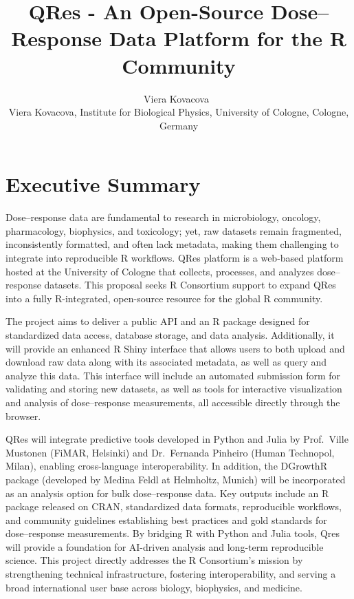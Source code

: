 \documentclass[
]{article}
\title{QRes - An Open-Source Dose--Response Data Platform for the R
Community}
\author{
{\large Viera Kovacova~\orcidlink{0000-0003-4581-4254}}%
 \\%
Viera Kovacova, Institute for Biological Physics, University of Cologne,
Cologne, Germany \\%
{\footnotesize \url{}} \and
}
\date{}
\newcommand{\published}[1]{%
   \gdef\puB{#1}}
\newcommand{\puB}{}
\begin{document}
\published{\textbf{2025-09-29}}

\maketitle






\section{Executive Summary}\label{executive-summary}

Dose--response data are fundamental to research in microbiology,
oncology, pharmacology, biophysics, and toxicology; yet, raw datasets
remain fragmented, inconsistently formatted, and often lack metadata,
making them challenging to integrate into reproducible R workflows. QRes
platform is a web-based platform hosted at the University of Cologne
that collects, processes, and analyzes dose--response datasets. This
proposal seeks R Consortium support to expand QRes into a fully
R-integrated, open-source resource for the global R community.

The project aims to deliver a public API and an R package designed for
standardized data access, database storage, and data analysis.
Additionally, it will provide an enhanced R Shiny interface that allows
users to both upload and download raw data along with its associated
metadata, as well as query and analyze this data. This interface will
include an automated submission form for validating and storing new
datasets, as well as tools for interactive visualization and analysis of
dose--response measurements, all accessible directly through the
browser.

QRes will integrate predictive tools developed in Python and Julia by
Prof.~Ville Mustonen (FiMAR, Helsinki) and Dr.~Fernanda Pinheiro (Human
Technopol, Milan), enabling cross-language interoperability. In
addition, the DGrowthR package (developed by Medina Feldl at Helmholtz,
Munich) will be incorporated as an analysis option for bulk
dose--response data. Key outputs include an R package released on CRAN,
standardized data formats, reproducible workflows, and community
guidelines establishing best practices and gold standards for
dose--response measurements. By bridging R with Python and Julia tools,
Qres will provide a foundation for AI-driven analysis and long-term
reproducible science. This project directly addresses the R Consortium's
mission by strengthening technical infrastructure, fostering
interoperability, and serving a broad international user base across
biology, biophysics, and medicine.
\end{document}
